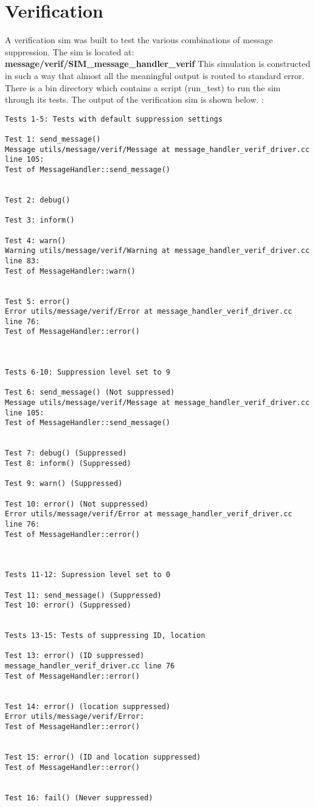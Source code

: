 \section{Verification}

A verification sim was built to test the various combinations of message
suppression. The sim is located at:  {\bf message/verif/SIM\_message\_handler\_verif }
This simulation is constructed in such a way that almost all the 
meaningful output is routed to standard error.  There is a 
bin directory which contains a script (run\_test) to run the sim 
through its tests.
The output of the verification sim is shown below.  :
\begin{verbatim}
Tests 1-5: Tests with default suppression settings

Test 1: send_message()
Message utils/message/verif/Message at message_handler_verif_driver.cc line 105:
Test of MessageHandler::send_message()


Test 2: debug()

Test 3: inform()

Test 4: warn()
Warning utils/message/verif/Warning at message_handler_verif_driver.cc line 83:
Test of MessageHandler::warn()


Test 5: error()
Error utils/message/verif/Error at message_handler_verif_driver.cc line 76:
Test of MessageHandler::error()



Tests 6-10: Suppression level set to 9

Test 6: send_message() (Not suppressed)
Message utils/message/verif/Message at message_handler_verif_driver.cc line 105:
Test of MessageHandler::send_message()


Test 7: debug() (Suppressed)
Test 8: inform() (Suppressed)

Test 9: warn() (Suppressed)

Test 10: error() (Not suppressed)
Error utils/message/verif/Error at message_handler_verif_driver.cc line 76:
Test of MessageHandler::error()



Tests 11-12: Supression level set to 0

Test 11: send_message() (Suppressed)
Test 10: error() (Suppressed)


Tests 13-15: Tests of suppressing ID, location

Test 13: error() (ID suppressed)
message_handler_verif_driver.cc line 76
Test of MessageHandler::error()


Test 14: error() (location suppressed)
Error utils/message/verif/Error:
Test of MessageHandler::error()


Test 15: error() (ID and location suppressed)
Test of MessageHandler::error()


Test 16: fail() (Never suppressed)
\end{verbatim}


